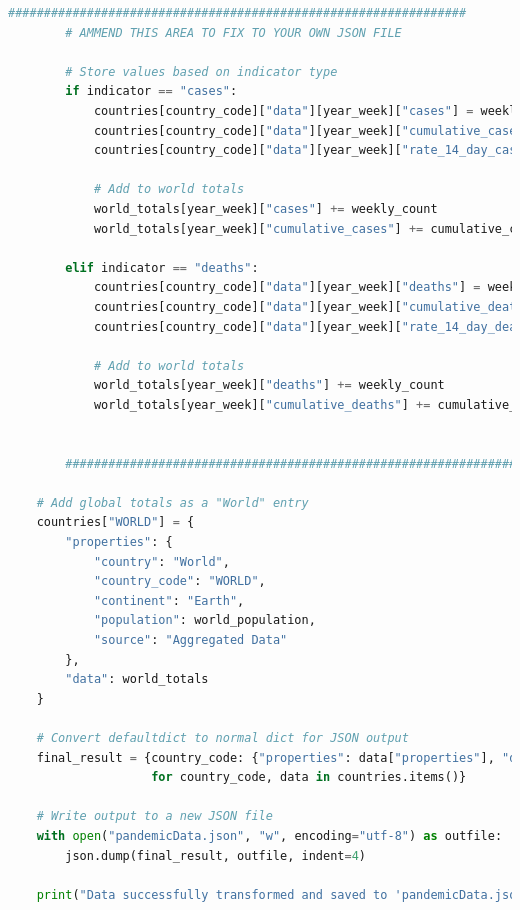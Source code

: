 \documentclass{report}
\begin{document}
\begin{lstlisting}[language=Python]
        ################################################################
        # AMMEND THIS AREA TO FIX TO YOUR OWN JSON FILE
        
        # Store values based on indicator type
        if indicator == "cases":
            countries[country_code]["data"][year_week]["cases"] = weekly_count
            countries[country_code]["data"][year_week]["cumulative_cases"] = cumulative_count
            countries[country_code]["data"][year_week]["rate_14_day_cases"] = rate_14_day
    
            # Add to world totals
            world_totals[year_week]["cases"] += weekly_count
            world_totals[year_week]["cumulative_cases"] += cumulative_count
    
        elif indicator == "deaths":
            countries[country_code]["data"][year_week]["deaths"] = weekly_count
            countries[country_code]["data"][year_week]["cumulative_deaths"] = cumulative_count
            countries[country_code]["data"][year_week]["rate_14_day_deaths"] = rate_14_day
    
            # Add to world totals
            world_totals[year_week]["deaths"] += weekly_count
            world_totals[year_week]["cumulative_deaths"] += cumulative_count
    
    
        ################################################################
            
    # Add global totals as a "World" entry
    countries["WORLD"] = {
        "properties": {
            "country": "World",
            "country_code": "WORLD",
            "continent": "Earth",
            "population": world_population,
            "source": "Aggregated Data"
        },
        "data": world_totals
    }
    
    # Convert defaultdict to normal dict for JSON output
    final_result = {country_code: {"properties": data["properties"], "data": dict(data["data"])} 
                    for country_code, data in countries.items()}
    
    # Write output to a new JSON file
    with open("pandemicData.json", "w", encoding="utf-8") as outfile:
        json.dump(final_result, outfile, indent=4)
    
    print("Data successfully transformed and saved to 'pandemicData.json'")
\end{lstlisting}
\newpage
\end{document}
